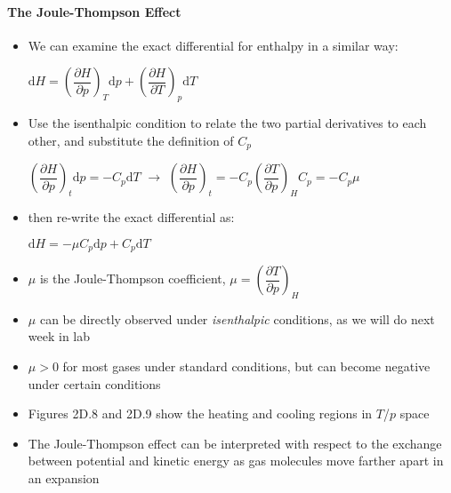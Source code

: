 \documentclass[12pt, openany, letterpaper]{memoir}
\begin{document}
\paragraph{The Joule-Thompson Effect}
\begin{itemize}
	\item We can examine the exact differential for enthalpy in a similar way:

	      $\mathrm{d}H = \left(\dfrac{\partial H}{\partial p}\right)_T\mathrm{d}p + \left(\dfrac{\partial H}{\partial T}\right)_p\mathrm{d}T$
	\item Use the isenthalpic condition to relate the two partial derivatives to each other, and substitute the definition of $C_p$

        $\left(\dfrac{\partial H}{\partial p}\right)_t\mathrm{d}p = -C_p\mathrm{d}T$ \hspace{1em} $\rightarrow$ \hspace{1em}
        $\left(\dfrac{\partial H}{\partial p}\right)_t=-C_p\left(\dfrac{\partial T}{\partial p}\right)_HC_p=-C_p\mu$
  \item then re-write the exact differential as:

	      $\mathrm{d}H = -\mu C_p\mathrm{d}p + C_p\mathrm{d}T$
	\item $\mu$ is the Joule-Thompson coefficient, $\mu = \left(\dfrac{\partial T}{\partial p}\right)_H$
	\item $\mu$ can be directly observed under \emph{isenthalpic} conditions, as we will do next week in lab
	\item $\mu > 0$ for most gases under standard conditions, but can become negative under certain conditions
	\item Figures 2D.8 and 2D.9 show the heating and cooling regions in $T$/$p$ space
	\item The Joule-Thompson effect can be interpreted with respect to the exchange between potential and kinetic energy as gas molecules move farther apart in an expansion
\end{itemize}
\end{document}
